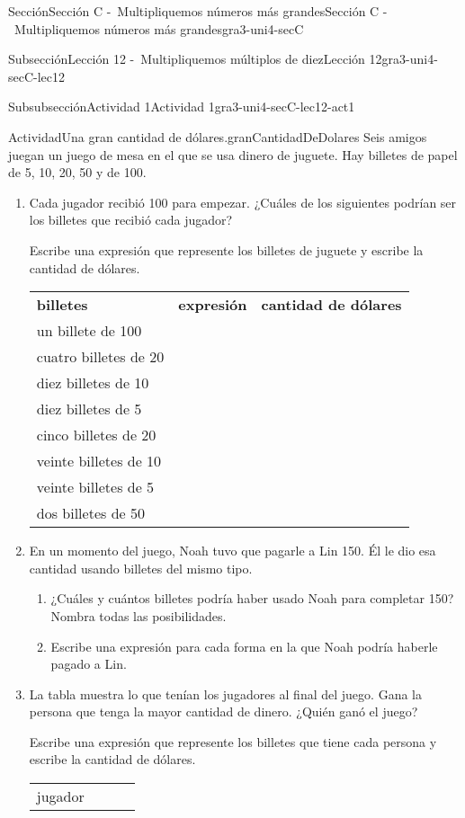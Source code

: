 \documentclass[twoside,10pt,]{article}
\newcommand{\tabularfont}{\relax}
\newcommand{\hrulethick} {\noalign{\hrule height 0.11em}}
\begin{document}
\begin{sectionptx}{Sección}{Sección C -~Multipliquemos números más grandes}{}{Sección C -~Multipliquemos números más grandes}{}{}{gra3-uni4-secC}
\begin{subsectionptx}{Subsección}{Lección 12 -~Multipliquemos múltiplos de diez}{}{Lección 12}{}{}{gra3-uni4-secC-lec12}
\begin{subsubsectionptx}{Subsubsección}{Actividad 1}{}{Actividad 1}{}{}{gra3-uni4-secC-lec12-act1}
\begin{activity}{Actividad}{Una gran cantidad de dólares.}{granCantidadDeDolares}%
Seis amigos juegan un juego de mesa en el que se usa dinero de juguete. Hay billetes de papel de \textdollar{}5, \textdollar{}10, \textdollar{}20, \textdollar{}50 y de \textdollar{}100.%
%
\begin{enumerate}
\item{}Cada jugador recibió \textdollar{}100 para empezar. ¿Cuáles de los siguientes podrían ser los billetes que recibió cada jugador?%
\par
Escribe una expresión que represente los billetes de juguete y escribe la cantidad de dólares.%
\begin{center}%
{\tabularfont%
\begin{tabular}{lll}
{\bfseries{}billetes}&{\bfseries{}expresión}&{\bfseries{}cantidad de dólares}\tabularnewline\hrulethick
un billete de \textdollar{}100&&\tabularnewline[0pt]
cuatro billetes de \textdollar{}20&&\tabularnewline[0pt]
diez billetes de \textdollar{}10&&\tabularnewline[0pt]
diez billetes de \textdollar{}5&&\tabularnewline[0pt]
cinco billetes de \textdollar{}20&&\tabularnewline[0pt]
veinte billetes de \textdollar{}10&&\tabularnewline[0pt]
veinte billetes de \textdollar{}5&&\tabularnewline[0pt]
dos billetes de \textdollar{}50&&
\end{tabular}
}%
\end{center}%
\item{}En un momento del juego, Noah tuvo que pagarle a Lin \textdollar{}150. Él le dio esa cantidad usando billetes del mismo tipo.%
%
\begin{enumerate}
\item{}¿Cuáles y cuántos billetes podría haber usado Noah para completar \textdollar{}150? Nombra todas las posibilidades.%
\item{}Escribe una expresión para cada forma en la que Noah podría haberle pagado a Lin.%
\end{enumerate}
\item{}La tabla muestra lo que tenían los jugadores al final del juego. Gana la persona que tenga la mayor cantidad de dinero. ¿Quién ganó el juego?%
\par
Escribe una expresión que represente los billetes que tiene cada persona y escribe la cantidad de dólares.%
\begin{center}%
{\tabularfont%
\begin{tabular}{ccll}
\multicolumn{1}{m{0.15\linewidth}}{\centering%
jugador%
}&\multicolumn{1}{m{0.35\linewidth}}{\centering%
}
\end{tabular}}
\end{center}
\end{enumerate}
\end{activity}
\end{subsubsectionptx}
\end{subsectionptx}
\end{sectionptx}
\end{document}
